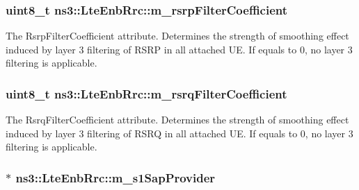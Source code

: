 \subsubsection[{\texorpdfstring{m\+\_\+rsrp\+Filter\+Coefficient}{m_rsrpFilterCoefficient}}]{\setlength{\rightskip}{0pt plus 5cm}uint8\+\_\+t ns3\+::\+Lte\+Enb\+Rrc\+::m\+\_\+rsrp\+Filter\+Coefficient\hspace{0.3cm}{\ttfamily [private]}}\hypertarget{classns3_1_1LteEnbRrc_ab5d107b13d8042f862008b8d440fe3a6}{}\label{classns3_1_1LteEnbRrc_ab5d107b13d8042f862008b8d440fe3a6}
The {\ttfamily Rsrp\+Filter\+Coefficient} attribute. Determines the strength of smoothing effect induced by layer 3 filtering of R\+S\+RP in all attached UE. If equals to 0, no layer 3 filtering is applicable. 
\subsubsection[{\texorpdfstring{m\+\_\+rsrq\+Filter\+Coefficient}{m_rsrqFilterCoefficient}}]{\setlength{\rightskip}{0pt plus 5cm}uint8\+\_\+t ns3\+::\+Lte\+Enb\+Rrc\+::m\+\_\+rsrq\+Filter\+Coefficient\hspace{0.3cm}{\ttfamily [private]}}\hypertarget{classns3_1_1LteEnbRrc_a505a1db46c8f5b6abe174a536485c44d}{}\label{classns3_1_1LteEnbRrc_a505a1db46c8f5b6abe174a536485c44d}
The {\ttfamily Rsrq\+Filter\+Coefficient} attribute. Determines the strength of smoothing effect induced by layer 3 filtering of R\+S\+RQ in all attached UE. If equals to 0, no layer 3 filtering is applicable. 
\subsubsection[{\texorpdfstring{m\+\_\+s1\+Sap\+Provider}{m_s1SapProvider}}]{$\ast$ ns3\+::\+Lte\+Enb\+Rrc\+::m\+\_\+s1\+Sap\+Provider\hspace{0.3cm}{\ttfamily [private]}}\hypertarget{classns3_1_1LteEnbRrc_ab64a0d43dde3ba668778ce55146afd02}{}\label{classns3_1_1LteEnbRrc_ab64a0d43dde3ba668778ce55146afd02}


